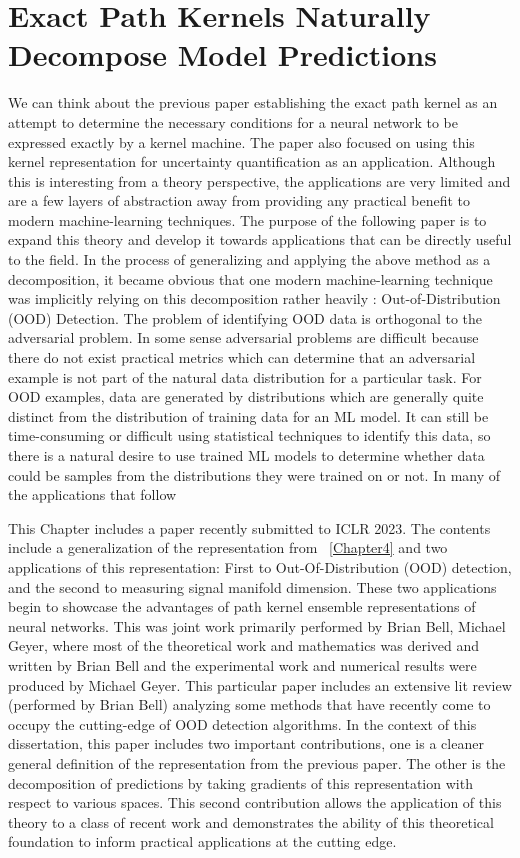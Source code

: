 \chapter{Exact Path Kernels Naturally Decompose Model Predictions}
\label{Chapter4a}

We can think about the previous paper establishing the exact path
kernel as an attempt to determine the necessary conditions for a
neural network to be expressed exactly by a kernel machine. The paper
also focused on using this kernel representation for uncertainty
quantification as an application. Although this is interesting from a
theory perspective, the applications are very limited and are a few
layers of abstraction away from providing any practical benefit to
modern machine-learning techniques. The purpose of the following paper
is to expand this theory and develop it towards applications that can
be directly useful to the field. In the process of generalizing and
applying the above method as a decomposition, it became obvious that
one modern machine-learning technique was implicitly relying on this
decomposition rather heavily : Out-of-Distribution (OOD)
Detection. The problem of identifying OOD data is orthogonal to the
adversarial problem. In some sense adversarial problems are difficult
because there do not exist practical metrics which can determine that
an adversarial example is not part of the natural data distribution
for a particular task. For OOD examples, data are generated by
distributions which are generally quite distinct from the distribution
of training data for an ML model. It can still be time-consuming or
difficult using statistical techniques to identify this data, so there
is a natural desire to use trained ML models to determine whether data
could be samples from the distributions they were trained on or
not. In many of the applications that follow

This Chapter includes a paper recently submitted to ICLR 2023. The
contents include a generalization of the representation from
~\ref{Chapter4} and two applications of this representation: First to
Out-Of-Distribution (OOD) detection, and the second to measuring
signal manifold dimension. These two applications begin to showcase
the advantages of path kernel ensemble representations of neural
networks. This was joint work primarily performed by Brian Bell,
Michael Geyer, where most of the theoretical work and mathematics was
derived and written by Brian Bell and the experimental work and
numerical results were produced by Michael Geyer. This particular
paper includes an extensive lit review (performed by Brian Bell)
analyzing some methods that have recently come to occupy the
cutting-edge of OOD detection algorithms. In the context of this
dissertation, this paper includes two important contributions, one is
a cleaner general definition of the representation from the previous
paper. The other is the decomposition of predictions by taking
gradients of this representation with respect to various spaces. This
second contribution allows the application of this theory to a class
of recent work and demonstrates the ability of this theoretical
foundation to inform practical applications at the cutting edge. 

